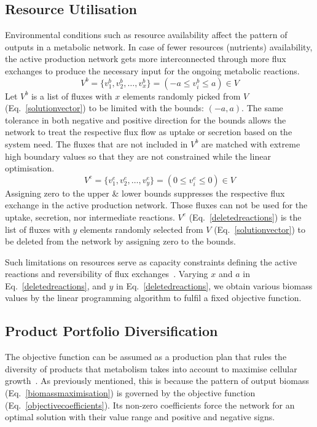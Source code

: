 \subsection{Resource Utilisation}
Environmental conditions such as resource availability affect the pattern of outputs in a metabolic network. In case of fewer resources (nutrients) availability, the active production network gets more interconnected through more flux exchanges to produce the necessary input for the ongoing metabolic reactions.~\cite{PRICE2004,MAHADEVAN2003,Reed01092004,BURGARD2001}
\begin{equation} %
	V^{b}=\{v^{b}_{1}, v^{b}_{2},\dots, v^{b}_{x}\}= (-a\le v^{b}_{i}\le a)\in V
	\label{constrainedfluxlist}
\end{equation}
Let $V^{b}$ is a list of fluxes with $x$ elements randomly picked from $V$ (Eq.~\eqref{solutionvector}) to be limited with the bounds: $(-a, a)$. The same tolerance in both negative and positive direction for the bounds allows the network to treat the respective flux flow as uptake or secretion based on the system need. The fluxes that are not included in $V^{b}$ are matched with extreme high boundary values so that they are not constrained while the linear optimisation.
\begin{equation} %
	V^{e}=\{v^{e}_{1}, v^{e}_{2},\dots, v^{e}_{y}\}= (0\le v^{e}_{i}\le 0)\in V
	\label{deletedreactions}
\end{equation}
Assigning zero to the upper \& lower bounds suppresses the respective flux exchange in the active production network. Those fluxes can not be used for the uptake, secretion, nor intermediate reactions. $V^{e}$ (Eq.~\eqref{deletedreactions}) is the list of fluxes with $y$ elements randomly selected from $V$ (Eq.~\eqref{solutionvector}) to be deleted from the network by assigning zero to the bounds.

Such limitations on resources serve as capacity constraints defining the active reactions and reversibility of flux exchanges~\cite{Edwards2001}. Varying $x$ and $a$ in Eq.~\eqref{deletedreactions}, and $y$ in Eq.~\eqref{deletedreactions}, we obtain various biomass values by the linear programming algorithm to fulfil a fixed objective function.

\subsection{Product Portfolio Diversification}
The objective function can be assumed as a production plan that rules the diversity of products that metabolism takes into account to maximise cellular growth~\cite{Edwards2001}. As previously mentioned, this is because the pattern of output biomass (Eq.~\eqref{biomassmaximisation}) is governed by the objective function (Eq.~\eqref{objectivecoefficients}). Its non-zero coefficients force the network for an optimal solution with their value range and positive and negative signs.    

